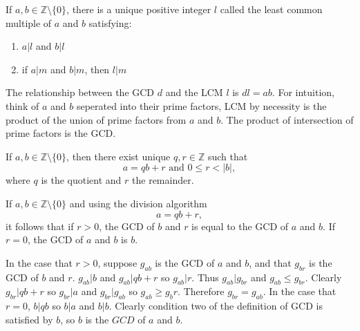 \documentclass{article}
\begin{document}
\begin{defi}[LCM]
	If \(a,b\in\mathbb{Z}\setminus\{0\}\), there is a unique positive integer \(l\) called the least common multiple of \(a\) and \(b\) satisfying:
	\begin{enumerate}
		\item \(a|l\) and \(b|l\)
		\item if \(a|m\) and \(b|m\), then \(l|m\)
	\end{enumerate}
\end{defi}
\begin{rema}
	The relationship between the GCD \(d\) and the LCM \(l\) is \(dl=ab\). For intuition, think of \(a\) and \(b\) seperated into their prime factors, LCM by necessity is the product of the union of prime factors from \(a\) and \(b\). The product of intersection of prime factors is the GCD.
\end{rema}
\begin{defi}
	If \(a,b\in\mathbb{Z}\setminus\{0\}\), then there exist unique \(q,r\in\mathbb{Z}\) such that
	\begin{equation*}
		a=qb+r\text{ and }0\leq r<\lvert b\rvert,
	\end{equation*}
	where \(q\) is the quotient and \(r\) the remainder.
\end{defi}
\begin{lem}
	\label{gcdrecursion}
	If \(a,b\in\mathbb{Z}\setminus\{0\}\) and using the division algorithm
	\begin{equation*}
		a=qb+r,
	\end{equation*}
	it follows that if \(r>0\), the GCD of \(b\) and \(r\) is equal to the GCD of \(a\) and \(b\). If \(r=0\), the GCD of \(a\) and \(b\) is \(b\).
	\begin{IEEEproof}
		In the case that \(r>0\), suppose \(g_{ab}\) is the GCD of \(a\) and \(b\), and that \(g_{br}\) is the GCD of \(b\) and \(r\). \(g_{ab}|b\) and \(g_{ab}|qb+r\) so \(g_{ab}|r\). Thus \(g_{ab}|g_{br}\) and \(g_{ab}\leq g_{br}\). Clearly \(g_{br}|qb+r\) so \(g_{br}|a\) and \(g_{br}|g_{ab}\) so \(g_{ab}\geq g_br\). Therefore \(g_{br}=g_{ab}\).
		\smallbreak
		In the case that \(r=0\), \(b|qb\) so \(b|a\) and \(b|b\). Clearly condition two of the definition of GCD is satisfied by \(b\), so \(b\) is the \(GCD\) of \(a\) and \(b\).
	\end{IEEEproof}
\end{lem}
\end{document}
